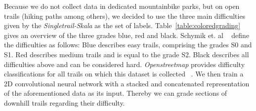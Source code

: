 \documentclass[runningheads]{llncs}
\begin{document}
Because we do not collect data in dedicated mountainbike parks, but on open trails (hiking paths among others), we decided to use the three main difficulties given by the \textit{Singletrail-Skala} as the set of labels.
Table~\ref{table:coloredgrading} gives an overview of the three grades blue, red and black.
Schymik et. al ~\cite{schymik2008singletrail} define the difficulties as follows:
Blue describes easy trails, comprising the grades S0 and S1.
Red describes medium trails and is equal to the grade S2.
Black describes all difficulties above and can be considered hard.
\textit{Openstreetmap} provides difficulty classifications for all trails on which this dataset is collected ~\cite{osmsingletrails}.
We then train a 2D convolutional neural network with a stacked and concatenated representation of the aforementioned data as its input.
Thereby we can grade sections of downhill trails regarding their difficulty.
\end{document}
